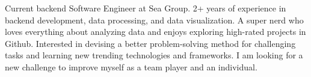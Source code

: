 

\begin{cvparagraph}

Current backend Software Engineer at Sea Group. 2+ years of experience in backend development, data processing, and data visualization. A super nerd who loves everything about analyzing data and enjoys exploring high-rated projects in Github. Interested in devising a better problem-solving method for challenging tasks and learning new trending technologies and frameworks. I am looking for a new challenge to improve myself as a team player and an individual.
\end{cvparagraph}
